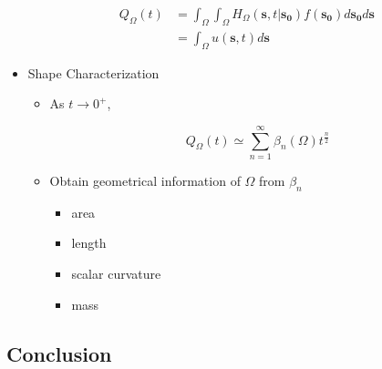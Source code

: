 \begin{itemize}
       \begin{align}
         Q_{\Omega}(t) &= \int_{\Omega} \int_{\Omega} H_{\Omega}(\bm{s}, t | \bm{s_0}) f(\bm{s_0})  d\bm{s_0} d\bm{s} \label{eq:heat_content_integral_full} \\
            &= \int_{\Omega} u(\bm{s}, t) d\bm{s} \label{eq:heat_content_integral_convol}
       \end{align}


     \item Shape Characterization

       \begin{itemize}
       \item As $t \rightarrow 0^{+}$,

         \begin{equation}\label{eq:heat_content_asy}
           Q_{\Omega}(t) \simeq \sum_{n=1}^{\infty} \beta_n(\Omega) t ^{\frac{n}{2}}
         \end{equation}
         
         
         \item Obtain geometrical information of $\Omega$ from $\beta_n$
           \begin{itemize}
           \item area
           \item length
           \item scalar curvature
           \item mass
         \end{itemize}
       \end{itemize}
       
       
   \end{itemize}



  \subsection{Conclusion}

